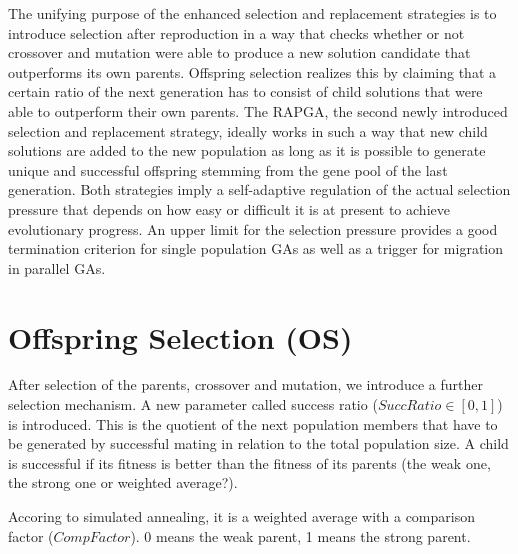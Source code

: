 \documentclass[12pt]{book}
\begin{document}
The unifying purpose of the enhanced selection and replacement strategies is to introduce selection after reproduction in a way that checks whether or not crossover and mutation were able to produce a new solution candidate that outperforms its own parents. Offspring selection realizes this by claiming that a certain ratio of the next generation has to consist of child solutions that were able to outperform their own parents. The RAPGA, the second newly introduced selection and replacement strategy, ideally works in such a way that new child solutions are added to the new population as long as it is possible to generate unique and successful offspring stemming from the gene pool of the last generation. Both strategies imply a self-adaptive regulation of the actual selection pressure that depends on how easy or difficult it is at present to achieve evolutionary progress. An upper limit for the selection pressure provides a good termination criterion for single population GAs as well as a trigger for migration in parallel GAs.

\section{Offspring Selection (OS)}
After selection of the parents, crossover and mutation, we introduce a further selection mechanism. A new parameter called success ratio ($SuccRatio \in [0,1]$) is introduced. This is the quotient of the next population members that have to be generated by successful mating in relation to the total population size. A child is successful if its fitness is better than the fitness of its parents (the weak one, the strong one or weighted average?).

Accoring to simulated annealing, it is a weighted average with a comparison factor ($CompFactor$). 0 means the weak parent, 1 means the strong parent.
\end{document}
